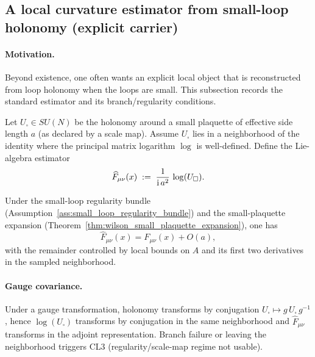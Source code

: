 \subsection{A local curvature estimator from small-loop holonomy (explicit carrier)}
\label{subsec:local_curvature_estimator_from_holonomy}
\paragraph{Motivation.}
\InterfaceTag Beyond existence, one often wants an explicit local object that is reconstructed from loop holonomy when the loops are small.
This subsection records the standard estimator and its branch/regularity conditions.

\begin{definition}
\label{def:curvature_estimator_log_holonomy}
\MathTag Let $U_\square\in SU(N)$ be the holonomy around a small plaquette of effective side length $a$ (as declared by a scale map).
Assume $U_\square$ lies in a neighborhood of the identity where the principal matrix logarithm $\log$ is well-defined.
Define the Lie-algebra estimator
\[
\widehat F_{\mu\nu}(x)\;:=\;\frac{1}{\mathrm{i}\,a^2}\,\log(U_\square).
\]
\end{definition}

\begin{proposition}
\label{prop:curvature_estimator_consistency_template}
\MathTag Under the small-loop regularity bundle (Assumption~\ref{ass:small_loop_regularity_bundle}) and the small-plaquette expansion (Theorem~\ref{thm:wilson_small_plaquette_expansion}), one has
\[
\widehat F_{\mu\nu}(x)=F_{\mu\nu}(x)+O(a),
\]
with the remainder controlled by local bounds on $A$ and its first two derivatives in the sampled neighborhood.
\end{proposition}

\paragraph{Gauge covariance.}
\MathTag Under a gauge transformation, holonomy transforms by conjugation $U_\square\mapsto g\,U_\square\,g^{-1}$, hence $\log(U_\square)$ transforms by conjugation in the same neighborhood and $\widehat F_{\mu\nu}$ transforms in the adjoint representation.
Branch failure or leaving the neighborhood triggers CL3 (regularity/scale-map regime not usable).
